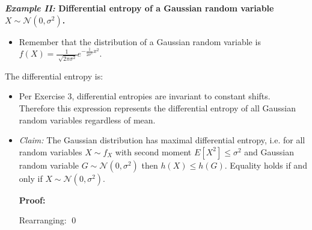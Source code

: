 \noindent \textbf{\textit{Example II:} Differential entropy of a Gaussian random variable $X \sim \mathcal{N}(0, \sigma^2)$.}
\begin{itemize}
\item Remember that the distribution of a Gaussian random variable is $f(X) = \frac{1}{\sqrt[]{2 \pi \sigma^2}}e^{- \frac{1}{2 \sigma^2}x^2}$.
\end{itemize}
The differential entropy is:
\begin{itemize}
\item Per Exercise 3, differential entropies are invariant to constant shifts. Therefore this expression represents the differential entropy of all Gaussian random variables regardless of mean.
\item \textit{Claim:} The Gaussian distribution has maximal differential entropy, i.e. for all random variables $X \sim f_X$ with second moment $E[X^2] \leq \sigma^2$ and Gaussian random variable $G \sim \mathcal{N}(0, \sigma^2)$ then $h(X) \leq h(G)$. Equality holds if and only if $X \sim \mathcal{N}(0, \sigma^2)$.

\textbf{Proof:}

Rearranging:
\qed
\end{itemize}

